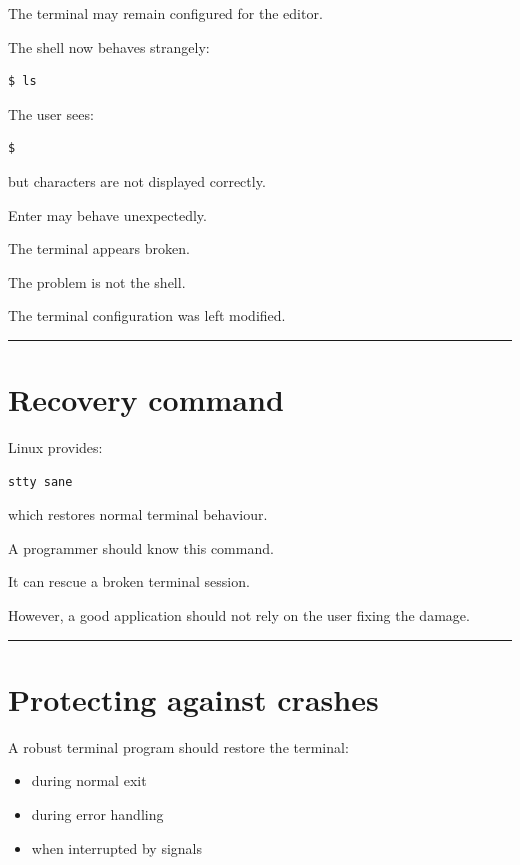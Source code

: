 \documentclass[
  oneside,
  openany]{book}
\providecommand{\tightlist}{%
  \setlength{\itemsep}{0pt}\setlength{\parskip}{0pt}}
\begin{document}
The terminal may remain configured for the editor.

The shell now behaves strangely:

\begin{verbatim}
$ ls
\end{verbatim}

The user sees:

\begin{verbatim}
$
\end{verbatim}

but characters are not displayed correctly.

Enter may behave unexpectedly.

The terminal appears broken.

The problem is not the shell.

The terminal configuration was left modified.

\begin{center}\rule{0.5\linewidth}{0.5pt}\end{center}

\hypertarget{recovery-command}{%
\section{Recovery command}\label{recovery-command}}

Linux provides:

\begin{verbatim}
stty sane
\end{verbatim}

which restores normal terminal behaviour.

A programmer should know this command.

It can rescue a broken terminal session.

However, a good application should not rely on the user fixing the
damage.

\begin{center}\rule{0.5\linewidth}{0.5pt}\end{center}

\hypertarget{protecting-against-crashes}{%
\section{Protecting against crashes}\label{protecting-against-crashes}}

A robust terminal program should restore the terminal:

\begin{itemize}
\tightlist
\item
  during normal exit
\item
  during error handling
\item
  when interrupted by signals
\end{itemize}
\end{document}
